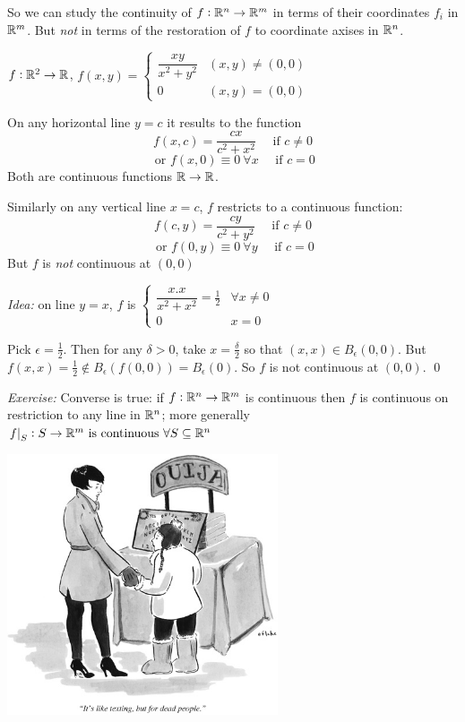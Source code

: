 \documentclass[10pt,twoside]{scrartcl}
\begin{document}
So we can study the continuity of $f: \mathbb{R}^n \to \mathbb{R}^m$ in terms of their coordinates $f_i$ in $\mathbb{R}^m$. But \emph{not} in terms of the restoration of $f$ to coordinate axises in $\mathbb{R}^n$.\vspace*{15pt}

\begin{example}
$f: \mathbb{R}^2 \to \mathbb{R}$, $f(x,y) = \begin{cases}
 	\dfrac{xy}{x^2 + y^2} & (x,y) \neq (0,0)\\
 	0 & (x,y) = (0,0)
 \end{cases}$
 
 On any horizontal line $y =c$ it results to the function 
 \[f(x,c) = \frac{cx}{c^2 + x^2} \quad \text{ if } c \neq 0\]
 \[\text{ or } f(x,0) \equiv 0 ~\forall x \quad \text{ if } c = 0\]
 Both are continuous functions $\mathbb{R} \to \mathbb{R}$. 
 
 Similarly on any vertical line $x = c$, $f$ restricts to a continuous function: 
  \[f(c,y) = \frac{cy}{c^2 + y^2} \quad \text{ if } c \neq 0\]
 \[\text{ or } f(0,y) \equiv 0 ~\forall y \quad \text{ if } c = 0\]
 But $f$ is \emph{not} continuous at $(0,0)$
 
 \emph{Idea:} on line $y=x$, $f$ is $\begin{cases}
	\dfrac{x.x}{x^2 + x^2} = \frac{1}{2} & \forall x \neq 0\\
	0 & x = 0
\end{cases}$

Pick $\epsilon = \frac{1}{2}$. Then for any $\delta > 0$, take $x = \frac{\delta}{2}$ so that $(x,x) \in B_\epsilon(0,0)$. But $f(x,x) = \frac{1}{2} \not\in B_\epsilon(f(0,0)) = B_\epsilon(0)$. So $f$ is not continuous at $(0,0)$. \qed
\end{example}

\emph{Exercise:} Converse is true: if $f: \mathbb{R}^n \to \mathbb{R}^m$ is continuous then $f$ is continuous on restriction to any line in $\mathbb{R}^n$; more generally $\left.f\right|_S: S \to \mathbb{R}^m \text{ is continuous } \forall S \subseteq \mathbb{R}^n$

\vspace*{2cm}

\begin{center}
\includegraphics[width = 8cm]{cartoon3.jpg}	
\end{center}
\end{document}
